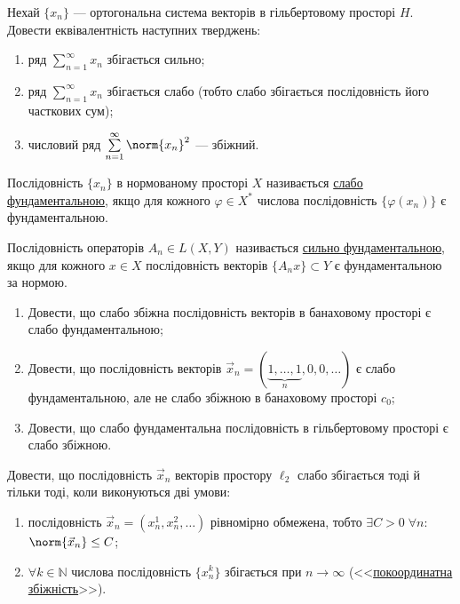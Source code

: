 
\begin{exercise}
    Нехай $\{x_n\}$ --- ортогональна система векторів в гільбертовому просторі $H$.
    Довести еквівалентність наступних тверджень:
    \begin{enumerate}
        \item ряд $\sum\limits^\infty_{n=1} x_n$ збігається сильно;
        \item ряд $\sum\limits^\infty_{n=1} x_n$ збігається слабо (тобто слабо збігається
        послідовність його часткових сум);
        \item числовий ряд $\sum\limits^\infty_{n=1} \norm{x_n}^2$ --- збіжний.
    \end{enumerate}
\end{exercise}

\begin{theory}
    Послідовність $\{x_n\}$ в нормованому просторі $X$ називається \uline{слабо фундаментальною},
    якщо для кожного $\varphi \in X^*$ числова послідовність $\{\varphi(x_n)\}$ є фундаментальною.
    
    Послідовність операторів $A_n \in L(X,Y)$ називається \uline{сильно фундаментальною},
    якщо для кожного $x \in X$ послідовність векторів $\{A_n x\} \subset Y$ є фундаментальною
    за нормою.
\end{theory}

\begin{exercise}
    \begin{enumerate}
        \item Довести, що слабо збіжна послідовність векторів в банаховому просторі 
        є слабо фундаментальною;
        \item Довести, що послідовність векторів $\vec{x}_n = 
        (\underbrace{1,\dots,1}_{n},0,0,\dots)$ є слабо фундаментальною, але не слабо 
        збіжною в банаховому просторі $c_0$;
        \item Довести, що слабо фундаментальна послідовність в гільбертовому просторі 
        є слабо збіжною.
    \end{enumerate}
\end{exercise}

\begin{exercise}
    Довести, що послідовність $\vec{x}_n$ векторів простору $\ell_2$ слабо збігається тоді
    й тільки тоді, коли виконуються дві умови:
    \begin{enumerate}
        \item послідовність $\vec{x}_n = (x_n^1,x_n^2,\dots)$ рівномірно обмежена, тобто
        $\exists C > 0 \; \forall n$: $\norm{\vec{x}_n} \leq C$;
        \item $\forall k \in \mathbb{N}$ числова послідовність $\{x_n^k\}$ збігається при
        $n \to \infty$ (<<\uline{покоординатна збіжність}>>).
    \end{enumerate}
\end{exercise}

